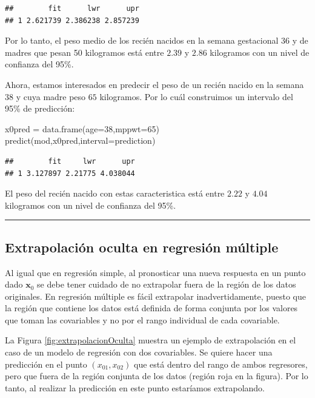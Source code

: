 \documentclass[
]{article}
\newenvironment{Shaded}{\begin{snugshade}}{\end{snugshade}}
\newcommand{\AttributeTok}[1]{\textcolor[rgb]{0.77,0.63,0.00}{#1}}
\newcommand{\DecValTok}[1]{\textcolor[rgb]{0.00,0.00,0.81}{#1}}
\newcommand{\FunctionTok}[1]{\textcolor[rgb]{0.00,0.00,0.00}{#1}}
\newcommand{\NormalTok}[1]{#1}
\newcommand{\OtherTok}[1]{\textcolor[rgb]{0.56,0.35,0.01}{#1}}
\newcommand{\StringTok}[1]{\textcolor[rgb]{0.31,0.60,0.02}{#1}}
\begin{document}
\begin{verbatim}
##        fit      lwr      upr
## 1 2.621739 2.386238 2.857239
\end{verbatim}

Por lo tanto, el peso medio de los recién nacidos en la semana gestacional 36 y de madres que pesan 50 kilogramos está entre \(2.39\) y \(2.86\) kilogramos con un nivel de confianza del 95\%.

Ahora, estamos interesados en predecir el peso de un recién nacido en la semana \(38\) y cuya madre peso \(65\) kilogramos. Por lo cuál construimos un intervalo del 95\% de predicción:

\begin{Shaded}
\begin{Highlighting}[]
\NormalTok{x0pred }\OtherTok{=} \FunctionTok{data.frame}\NormalTok{(}\AttributeTok{age=}\DecValTok{38}\NormalTok{,}\AttributeTok{mppwt=}\DecValTok{65}\NormalTok{)}
\FunctionTok{predict}\NormalTok{(mod,x0pred,}\AttributeTok{interval=}\StringTok{\textquotesingle{}prediction\textquotesingle{}}\NormalTok{)}
\end{Highlighting}
\end{Shaded}

\begin{verbatim}
##        fit     lwr      upr
## 1 3.127897 2.21775 4.038044
\end{verbatim}

El peso del recién nacido con estas caracteristica está entre \(2.22\) y \(4.04\) kilogramos con un nivel de confianza del 95\%.

\rule{\textwidth}{0.4pt}

\hypertarget{extrapolaciuxf3n-oculta-en-regresiuxf3n-muxfaltiple}{%
\subsection{Extrapolación oculta en regresión múltiple}\label{extrapolaciuxf3n-oculta-en-regresiuxf3n-muxfaltiple}}

Al igual que en regresión simple, al pronosticar una nueva respuesta en un punto dado \(\boldsymbol x_{0}\) se debe tener cuidado de no extrapolar fuera de la región de los datos originales. En regresión múltiple es fácil extrapolar inadvertidamente, puesto que la región que contiene los datos está definida de forma conjunta por los valores que toman las covariables y no por el rango individual de cada covariable.

La Figura \ref{fig:extrapolacionOculta} muestra un ejemplo de extrapolación en el caso de un modelo de regresión con dos covariables. Se quiere hacer una predicción en el punto \((x_{01},x_{02})\) que está dentro del rango de ambos regresores, pero que fuera de la región conjunta de los datos (región roja en la figura). Por lo tanto, al realizar la predicción en este punto estaríamos extrapolando.
\end{document}
